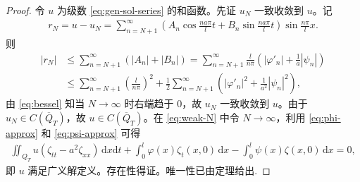 \documentclass[../../main.tex]{subfiles}%
\begin{document}
\begin{proof}
令 $u$ 为级数 \eqref{eq:gen-sol-series} 的和函数。先证 $u_N$ 一致收敛到 $u$。记
\begin{align*}
r_N=u-u_N=\sum_{n=N+1}^{\infty}\left(A_n\cos\frac{na\pi}{l}t+B_n\sin\frac{na\pi}{l}t\right)\sin\frac{n\pi}{l}x.
\end{align*}
则
\begin{align*}
|r_N|&\leqslant \sum_{n=N+1}^{\infty}(|A_n|+|B_n|)
=\sum_{n=N+1}^{\infty}\frac{l}{n\pi}\left(|\varphi'_n|+\frac{1}{a}|\psi_n|\right) \\
&\leqslant \sum_{n=N+1}^{\infty}\left(\frac{l}{n\pi}\right)^2+\frac{1}{2}\sum_{n=N+1}^{\infty}\left(|\varphi'_n|^2+\frac{1}{a^2}|\psi_n|^2\right),
\end{align*}
由 \eqref{eq:bessel} 知当 $N\to\infty$ 时右端趋于 $0$，故 $u_N$ 一致收敛到 $u$。由于 $u_N\in C(\overline{Q}_T)$，故 $u\in C(\overline{Q}_T)$。在 \eqref{eq:weak-N} 中令 $N\to\infty$，利用 \eqref{eq:phi-approx} 和 \eqref{eq:psi-approx} 可得
\begin{align*}
\iint_{Q_T}u(\zeta_{tt}-a^2\zeta_{xx})\,\mathrm{d}x\mathrm{d}t+\int_0^l\varphi(x)\zeta_t(x,0)\,\mathrm{d}x-\int_0^l\psi(x)\zeta(x,0)\,\mathrm{d}x=0,
\end{align*}
即 $u$ 满足广义解定义。存在性得证。唯一性已由定理给出.
\end{proof}
\end{document}
